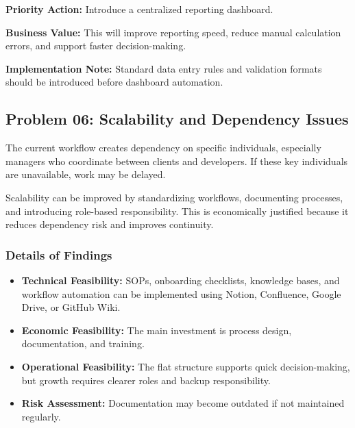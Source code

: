 \documentclass[12pt,a4paper]{report}
\begin{document}
\begin{recommendBox}
\textbf{Priority Action:} Introduce a centralized reporting dashboard.

\textbf{Business Value:} This will improve reporting speed, reduce manual calculation errors, and support faster decision-making.

\textbf{Implementation Note:} Standard data entry rules and validation formats should be introduced before dashboard automation.
\end{recommendBox}

\subsection{Problem 06: Scalability and Dependency Issues}

\begin{problemBox}
The current workflow creates dependency on specific individuals, especially managers who coordinate between clients and developers. If these key individuals are unavailable, work may be delayed.
\end{problemBox}

\begin{summaryBox}
Scalability can be improved by standardizing workflows, documenting processes, and introducing role-based responsibility. This is economically justified because it reduces dependency risk and improves continuity.
\end{summaryBox}

\subsubsection{Details of Findings}

\begin{itemize}[leftmargin=*]
    \item \textbf{Technical Feasibility:} SOPs, onboarding checklists, knowledge bases, and workflow automation can be implemented using Notion, Confluence, Google Drive, or GitHub Wiki.
    \item \textbf{Economic Feasibility:} The main investment is process design, documentation, and training.
    \item \textbf{Operational Feasibility:} The flat structure supports quick decision-making, but growth requires clearer roles and backup responsibility.
    \item \textbf{Risk Assessment:} Documentation may become outdated if not maintained regularly.
\end{itemize}
\end{document}
